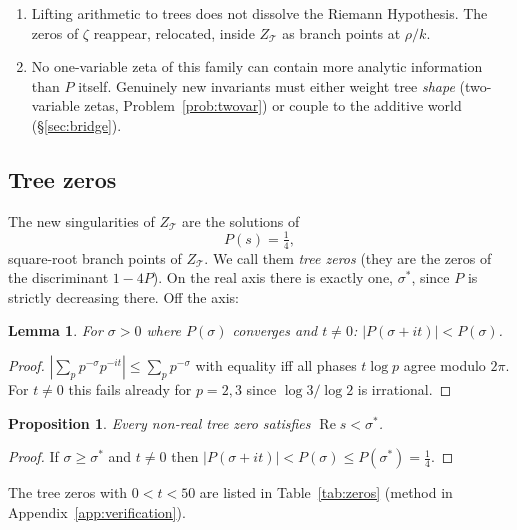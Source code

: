 \documentclass[11pt]{article}
\newcommand{\cT}{\mathcal{T}}   %
\numberwithin{equation}{section}
\theoremstyle{plain}
\newtheorem{proposition}[theorem]{Proposition}
\newtheorem{lemma}[theorem]{Lemma}
\theoremstyle{definition}
\theoremstyle{remark}
\begin{document}
\begin{enumerate}
\item Lifting arithmetic to trees does not dissolve the Riemann Hypothesis. The zeros
of $\zeta$ reappear, relocated, inside $Z_\cT$ as branch points at $\rho/k$.
\item No one-variable zeta of this family can contain more analytic information than
$P$ itself. Genuinely new invariants must either weight tree \emph{shape} (two-variable
zetas, Problem~\ref{prob:twovar}) or couple to the additive world (\S\ref{sec:bridge}).
\end{enumerate}

\subsection{Tree zeros}

The new singularities of $Z_\cT$ are the solutions of
\begin{equation}\label{eq:treezero}
P(s) = \tfrac14,
\end{equation}
square-root branch points of $Z_\cT$. We call them \emph{tree zeros} (they are the
zeros of the discriminant $1 - 4P$). On the real axis there is exactly one, $\sigma^{*}$,
since $P$ is strictly decreasing there. Off the axis:

\begin{lemma}\label{lem:strict}
For $\sigma > 0$ where $P(\sigma)$ converges and $t \neq 0$:
$|P(\sigma + it)| < P(\sigma)$.
\end{lemma}

\begin{proof}
$|\sum_p p^{-\sigma} p^{-it}| \le \sum_p p^{-\sigma}$ with equality iff all phases
$t \log p$ agree modulo $2\pi$. For $t \ne 0$ this fails already for $p = 2, 3$ since
$\log 3/\log 2$ is irrational.
\end{proof}

\begin{proposition}\label{prop:strip}
Every non-real tree zero satisfies $\operatorname{Re} s < \sigma^{*}$.
\end{proposition}

\begin{proof}
If $\sigma \ge \sigma^{*}$ and $t \neq 0$ then
$|P(\sigma+it)| < P(\sigma) \le P(\sigma^{*}) = \tfrac14$.
\end{proof}

The tree zeros with $0 < t < 50$ are listed in Table~\ref{tab:zeros} (method in
Appendix~\ref{app:verification}).
\end{document}
